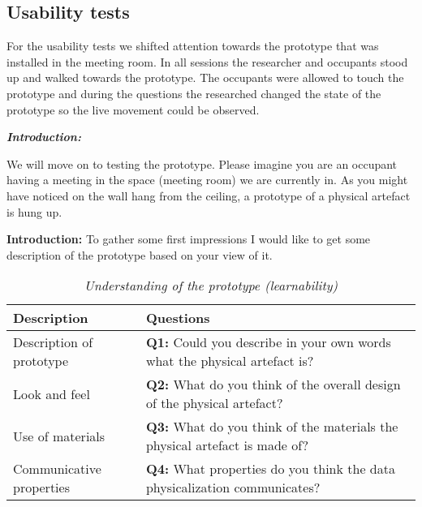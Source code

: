 \begin{appendices}
\section{Usability tests}
\label{appendix:usability}

For the usability tests we shifted attention towards the prototype that was installed in the meeting room. In all sessions the researcher and occupants stood up and walked towards the prototype. The occupants were allowed to touch the prototype and during the questions the researched changed the state of the prototype so the live movement could be observed.

\vspace{5pt}

\newpage

\textit{\textbf{Introduction:}}

We will move on to testing the prototype. Please imagine you are an occupant having a meeting in the space (meeting room) we are currently in. As you might have noticed on the wall hang from the ceiling, a prototype of a physical artefact is hung up.\\

\begin{table}[htbp]
    \captionsetup{justification=raggedright,singlelinecheck=false}
    \caption{\textit{Understanding of the prototype (learnability)}} 
    \raggedright \textbf{Introduction:} To gather some first impressions I would like to get some description of the prototype based on your view of it.
    \label{tab:column_widths}
    \begin{tabularx}{\textwidth}{|p{}|X|}
        \hline
        \textbf{Description} & \textbf{Questions} \\
        \hline
        Description of prototype & \textbf{Q1:} Could you describe in your own words what the physical artefact is? \\
        \hline
        Look and feel & 
        \textbf{Q2:} What do you think of the overall design of the physical artefact? \\
        \hline
        Use of materials & 
        \textbf{Q3:} What do you think of the materials the physical artefact is made of? \\
        \hline
        Communicative properties & 
        \textbf{Q4:} What properties do you think the data physicalization communicates?\\
        \hline        
    \end{tabularx}
\end{table}


\end{appendices}
